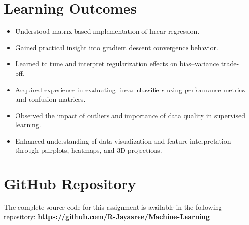\documentclass[a4paper,12pt]{article}
\begin{document}
\section*{Learning Outcomes}
\begin{itemize}
    \item Understood matrix-based implementation of linear regression.
    \item Gained practical insight into gradient descent convergence behavior.
    \item Learned to tune and interpret regularization effects on bias–variance trade-off.
    \item Acquired experience in evaluating linear classifiers using performance metrics and confusion matrices.
    \item Observed the impact of outliers and importance of data quality in supervised learning.
    \item Enhanced understanding of data visualization and feature interpretation through pairplots, heatmaps, and 3D projections.
\end{itemize}
\section*{GitHub Repository}

The complete source code for this assignment is available in the following repository: 
\href{https://github.com/R-Jayasree/Machine-Learning} \textbf{https://github.com/R-Jayasree/Machine-Learning}
\end{document}
